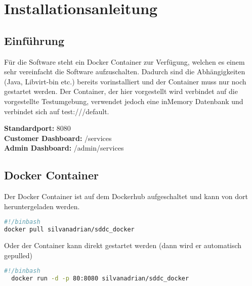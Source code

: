 \chapter{Installationsanleitung}
\section{Einführung}
Für die Software steht ein Docker Container zur Verfügung, welchen es einem sehr 
vereinfacht die Software aufzuschalten.
Dadurch sind die Abhängigkeiten (Java, Libvirt-bin etc.) bereits vorinstalliert 
und der Container muss nur noch gestartet werden.
Der Container, der hier vorgestellt wird verbindet auf die vorgestellte 
Testumgebung, verwendet jedoch eine inMemory Datenbank und verbindet sich auf 
test:///default.

\textbf{Standardport:} 8080
\\
\textbf{Customer Dashboard:} /services
\\
\textbf{Admin Dashboard:} /admin/services

\section{Docker Container}
Der Docker Container ist auf dem Dockerhub aufgeschaltet und kann von dort 
heruntergeladen werden.
\begin{lstlisting}[style=BASH,language=bash,caption={Pull Docker Container}]
#!/binbash
docker pull silvanadrian/sddc_docker
\end{lstlisting}
Oder der Container kann direkt gestartet werden (dann wird er automatisch gepulled)

\begin{lstlisting}[style=Bash,language=bash,caption={Run Docker Container}]
  #!/binbash
  docker run -d -p 80:8080 silvanadrian/sddc_docker
\end{lstlisting}